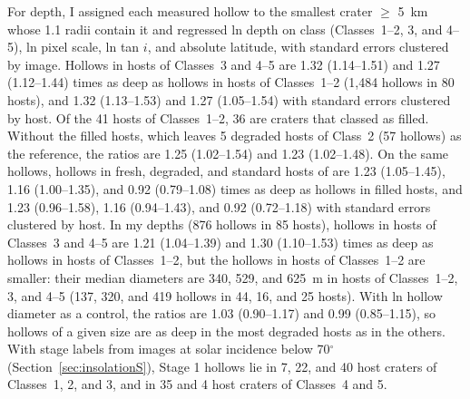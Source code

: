 \documentclass{planetary}
\begin{document}
For depth, I assigned each measured hollow to the smallest crater $\geq$ 5~km whose 1.1 radii contain it and regressed ln depth on class (Classes~1--2, 3, and 4--5), ln pixel scale, ln tan $i$, and absolute latitude, with standard errors clustered by image. Hollows in hosts of Classes~3 and 4--5 are 1.32 (1.14--1.51) and 1.27 (1.12--1.44) times as deep as hollows in hosts of Classes~1--2 (1,484 hollows in 80 hosts), and 1.32 (1.13--1.53) and 1.27 (1.05--1.54) with standard errors clustered by host. Of the 41 hosts of Classes~1--2, 36 are craters that \textcite{herrick2018} classed as filled. Without the filled hosts, which leaves 5 degraded hosts of Class~2 (57 hollows) as the reference, the ratios are 1.25 (1.02--1.54) and 1.23 (1.02--1.48). On the same hollows, hollows in fresh, degraded, and standard hosts of \textcite{herrick2018} are 1.23 (1.05--1.45), 1.16 (1.00--1.35), and 0.92 (0.79--1.08) times as deep as hollows in filled hosts, and 1.23 (0.96--1.58), 1.16 (0.94--1.43), and 0.92 (0.72--1.18) with standard errors clustered by host. In my depths (876 hollows in 85 hosts), hollows in hosts of Classes~3 and 4--5 are 1.21 (1.04--1.39) and 1.30 (1.10--1.53) times as deep as hollows in hosts of Classes~1--2, but the hollows in hosts of Classes~1--2 are smaller: their median diameters are 340, 529, and 625~m in hosts of Classes~1--2, 3, and 4--5 (137, 320, and 419 hollows in 44, 16, and 25 hosts). With ln hollow diameter as a control, the ratios are 1.03 (0.90--1.17) and 0.99 (0.85--1.15), so hollows of a given size are as deep in the most degraded hosts as in the others. With stage labels from images at solar incidence below 70$^\circ$ (Section~\ref{sec:insolationS}), Stage 1 hollows lie in 7, 22, and 40 host craters of Classes~1, 2, and 3, and in 35 and 4 host craters of Classes~4 and 5.
\end{document}
